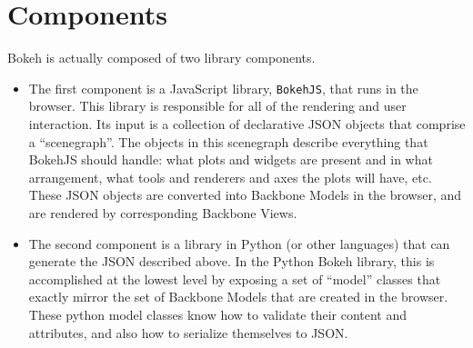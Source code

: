 \documentclass[a4paper,12pt]{article}
\begin{document}
		\Large
\section*{Components}
Bokeh is actually composed of two library components.

\begin{itemize}
	\item The first component is a JavaScript library, \texttt{BokehJS}, that runs in the browser. This library is responsible for all of the rendering and user interaction. Its input is a collection of declarative JSON objects that comprise a “scenegraph”. The objects in this scenegraph describe everything that BokehJS should handle: what plots and widgets are present and in what arrangement, what tools and renderers and axes the plots will have, etc. These JSON objects are converted into Backbone Models in the browser, and are rendered by corresponding Backbone Views.
	
	\item The second component is a library in Python (or other languages) that can generate the JSON described above. In the Python Bokeh library, this is accomplished at the lowest level by exposing a set of “model” classes that exactly mirror the set of Backbone Models that are created in the browser. These python model classes know how to validate their content and attributes, and also how to serialize themselves to JSON. 
	
\end{itemize}
\newpage
\end{document}
